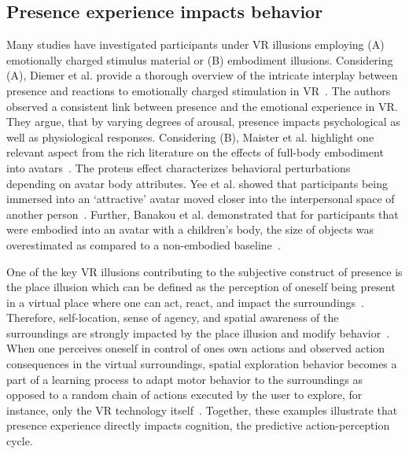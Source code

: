 \subsection{Presence experience impacts behavior}
Many studies have investigated participants under VR illusions employing (A) emotionally charged stimulus material or (B) embodiment illusions. Considering (A), Diemer et al. provide a thorough overview of the intricate interplay between presence and reactions to emotionally charged stimulation in VR~\cite{Diemer2015}. The authors observed a consistent link between presence and the emotional experience in VR. They argue, that by varying degrees of arousal, presence impacts psychological as well as physiological responses. Considering (B), Maister et al. highlight one relevant aspect from the rich literature on the effects of full-body embodiment into avatars~\cite{Maister2015}. The proteus effect characterizes behavioral perturbations depending on avatar body attributes. Yee et al. showed that participants being immersed into an `attractive' avatar moved closer into the interpersonal space of another person~\cite{Yee2007}. Further, Banakou et al. demonstrated that for participants that were embodied into an avatar with a children's body, the size of objects was overestimated as compared to a non-embodied baseline~\cite{Banakou2013}.

One of the key VR illusions contributing to the subjective construct of presence is the place illusion which can be defined as the perception of oneself being present in a virtual place where one can act, react, and impact the surroundings~\cite{Slater2009}. Therefore, self-location, sense of agency, and spatial awareness of the surroundings are strongly impacted by the place illusion and modify behavior~\cite{Kilteni2012}. When one perceives oneself in control of ones own actions and observed action consequences in the virtual surroundings, spatial exploration behavior becomes a part of a learning process to adapt motor behavior to the surroundings as opposed to a random chain of actions executed by the user to explore, for instance, only the VR technology itself~\cite{Tan2011}. Together, these examples illustrate that presence experience directly impacts cognition, the predictive action-perception cycle.




